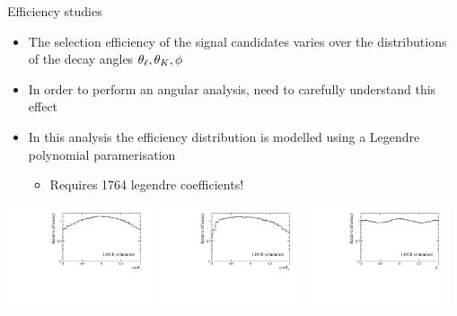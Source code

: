 \documentclass[aspectratio=1610]{beamer}
\begin{document}
\begin{frame}{Efficiency studies}

\begin{itemize}
  \item The selection efficiency of the signal candidates varies over the distributions of the decay angles $\theta_\ell,\theta_K,\phi$
  \item In order to perform an angular analysis, need to carefully understand this effect
  \item In this analysis the efficiency distribution is modelled using a Legendre polynomial paramerisation
  \begin{itemize}
    \item Requires 1764 legendre coefficients!
  \end{itemize}
\end{itemize}

\bigskip

\begin{center}
\includegraphics[width=0.32\textwidth]{figs/kpimm/acceptance/Fig3a.pdf}
\includegraphics[width=0.32\textwidth]{figs/kpimm/acceptance/Fig3b.pdf}
\includegraphics[width=0.32\textwidth]{figs/kpimm/acceptance/Fig3c.pdf}
\end{center}

\end{frame}
\end{document}
